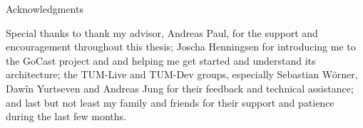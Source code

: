 \thispagestyle{empty}

\vspace*{20mm}

\begin{center}
    { Acknowledgments}
\end{center}

\vspace{10mm}

\noindent Special thanks to thank my advisor, Andreas Paul, for the support and encouragement throughout this thesis; Joscha Henningsen for introducing me to the GoCast project and and helping me get started and understand its architecture; the TUM-Live and TUM-Dev groups, especially Sebastian Wörner, Dawîn Yurtseven and Andreas Jung for their feedback and technical assistance; and last but not least my family and friends for their support and patience during the last few months.

\cleardoublepage{}
